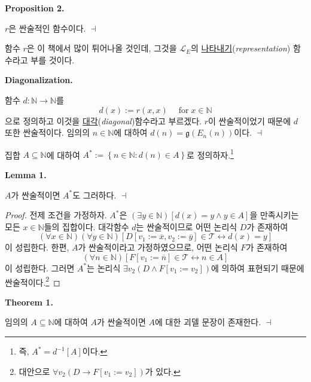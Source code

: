 \documentclass[12pt]{paper}
\newcommand{\gnum}
{ \mathfrak{g}
}
\newenvironment{context}[1][]
{ \noindent \textbf{{#1}.}
}
{ \hfill $ \dashv $
}
\begin{document}
  \begin{context}[Proposition 2]
    $r$은 싼술적인 함수이다.
  \end{context}

  함수 $r$은 이 책에서 많이 튀어나올 것인데, 그것을 $\mathcal{L}_{E}$의 \underline{나타내기}(\textit{representation}) 함수라고 부를 것이다.

  \begin{context}[Diagonalization]
    함수 $d : \mathbb{N} \to \mathbb{N}$를 $$d \left( x \right) := r \left( x , x \right) \quad \mathop{\mathrm{for}} x \in \mathbb{N} $$으로 정의하고
    이것을 \underline{대각}(\textit{diagonal})함수라고 부르겠다.
    $r$이 싼술적이었기 때문에 $d$ 또한 싼술적이다.
    임의의 $n \in \mathbb{N}$에 대하여 $d \left( n \right) = \gnum \left( E_{n} \left( n \right) \right)$이다.
  \end{context}

  집합 $A \subseteq \mathbb{N}$에 대하여 $A^{*} := \left\{ n \in \mathbb{N} : d \left( n \right) \in A \right\}$로 정의하자.\footnote
  {
    즉, $A^{*} = d^{-1} \left[ A \right]$이다.
  }

  \begin{context}[Lemma 1]
    $A$가 싼술적이면 $A^{*}$도 그러하다.
  \end{context}

  \begin{proof}
    전제 조건을 가정하자.
    $A^{*}$은 $\left( \exists y \in \mathbb{N} \right) \left[ d \left( x \right) = y \land y \in A \right]$을 만족시키는 모든 $x \in \mathbb{N}$들의 집합이다.
    대각함수 $d$는 싼술적이므로 어떤 논리식 $D$가 존재하여 $$ \left( \forall x \in \mathbb{N} \right) \left( \forall y \in \mathbb{N} \right) \left[ D \left[ v_1 := \overline{x} , v_2 := \overline{y} \right] \in \mathcal{T} \leftrightarrow d \left( x \right) = y \right] $$이 성립한다.
    한편, $A$가 싼술적이라고 가정하였으므로, 어떤 논리식 $F$가 존재하여 $$ \left( \forall n \in \mathbb{N} \right) \left[ F \left[ v_1 := \overline{n} \right] \in \mathcal{T} \leftrightarrow n \in A \right]$$이 성립한다.
    그러면 $A^{*}$는 논리식 $\exists v_2 \left( D \land F \left[ v_1 := v_2 \right] \right)$에 의하여 표현되기 때문에 싼술적이다.\footnote
    {
      대안으로 $\forall v_2 \left( D \rightarrow F \left[ v_1 := v_2 \right] \right)$가 있다.
    }
  \end{proof}

  \begin{context}[Theorem 1]
    임의의 $A \subseteq \mathbb{N}$에 대하여 $A$가 싼술적이면 $A$에 대한 괴델 문장이 존재한다.
  \end{context}
\end{document}
